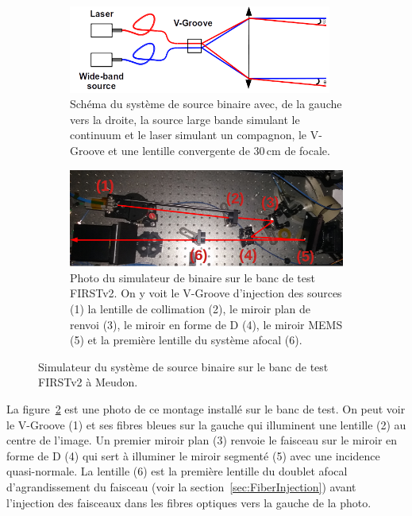 \begin{figure}[ht!]
    \centering
    \begin{subfigure}{\textwidth}
        \centering
        \includegraphics[width=0.95\textwidth]{Figure_Chap4/BinarySystemScheme_02.png}
        \caption{Schéma du système de source binaire avec, de la gauche vers la droite, la source large bande simulant le continuum et le laser simulant un compagnon, le V-Groove et une lentille convergente de $30 \,$cm de focale.}
        \label{fig:BinarySystA}
    \end{subfigure}
    \begin{subfigure}[t]{0.95\textwidth}
        \centering
        \includegraphics[width=\textwidth]{Figure_Chap4/20210531_BinarySetup_Crop_Annotation.png}
        \caption{Photo du simulateur de binaire sur le banc de test FIRSTv2. On y voit le V-Groove d'injection des sources (1) la lentille de collimation (2), le miroir plan de renvoi (3), le miroir en forme de D (4), le miroir MEMS (5) et la première lentille du système afocal (6).}
        \label{fig:BinarySystB}
    \end{subfigure}
    \caption[Simulateur du système de source binaire sur le banc de test FIRSTv2 à Meudon.]{Simulateur du système de source binaire sur le banc de test FIRSTv2 à Meudon.}
    \label{fig:BinarySyst}
\end{figure}

La figure~\ref{fig:BinarySystB} est une photo de ce montage installé sur le banc de test. On peut voir le V-Groove (1) et ses fibres bleues sur la gauche qui illuminent une lentille (2) au centre de l'image. Un premier miroir plan (3) renvoie le faisceau sur le miroir en forme de D (4) qui sert à illuminer le miroir segmenté (5) avec une incidence quasi-normale. La lentille (6) est la première lentille du doublet afocal d'agrandissement du faisceau (voir la section~\ref{sec:FiberInjection}) avant l'injection des faisceaux dans les fibres optiques vers la gauche de la photo.

